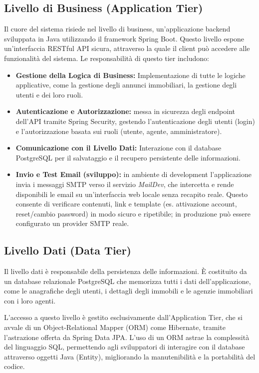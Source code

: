 \subsection{Livello di Business (Application Tier)}
Il cuore del sistema risiede nel livello di business, un'applicazione backend sviluppata in Java utilizzando il framework Spring Boot. Questo livello espone un'interfaccia RESTful API sicura, attraverso la quale il client può accedere alle funzionalità del sistema. Le responsabilità di questo tier includono:
\begin{itemize}
    \item \textbf{Gestione della Logica di Business:} Implementazione di tutte le logiche applicative, come la gestione degli annunci immobiliari, la gestione degli utenti e dei loro ruoli.
    \item \textbf{Autenticazione e Autorizzazione:} messa in sicurezza degli endpoint dell'API tramite Spring Security, gestendo l'autenticazione degli utenti (login) e l'autorizzazione basata sui ruoli (utente, agente, amministratore).
    \item \textbf{Comunicazione con il Livello Dati:} Interazione con il database PostgreSQL per il salvataggio e il recupero persistente delle informazioni.
    \item \textbf{Invio e Test Email (sviluppo):} in ambiente di development l'applicazione invia i messaggi SMTP verso il servizio \textit{MailDev}, che intercetta e rende disponibili le email su un'interfaccia web locale senza recapito reale. Questo consente di verificare contenuti, link e template (es. attivazione account, reset/cambio password) in modo sicuro e ripetibile; in produzione può essere configurato un provider SMTP reale.
\end{itemize}

\subsection{Livello Dati (Data Tier)}
Il livello dati è responsabile della persistenza delle informazioni. È costituito da un database relazionale PostgreSQL che memorizza tutti i dati dell'applicazione, come le anagrafiche degli utenti, i dettagli degli immobili e le agenzie immobiliari con i loro agenti.

L'accesso a questo livello è gestito esclusivamente dall'Application Tier, che si avvale di un Object-Relational Mapper (ORM) come Hibernate, tramite l'astrazione offerta da Spring Data JPA. L'uso di un ORM astrae la complessità del linguaggio SQL, permettendo agli sviluppatori di interagire con il database attraverso oggetti Java (Entity), migliorando la manutenibilità e la portabilità del codice.

